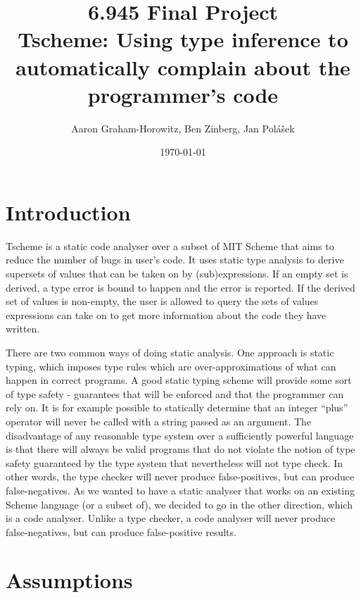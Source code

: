\documentclass[a4paper]{article}
\begin{document}
\title{6.945 Final Project\\
Tscheme: Using type inference to automatically complain about the programmer's code}
\date{\today}
\author{Aaron Graham-Horowitz, Ben Zinberg, Jan Polášek}
\maketitle

\newpage

\section{Introduction}

Tscheme is a static code analyser over a subset of MIT Scheme
that aims to reduce the number of bugs in user's code.
It uses static type analysis to derive supersets of values that can be taken on by
(sub)expressions.
If an empty set is derived, a type error is bound to happen and the error is reported.
If the derived set of values is non-empty, the user is allowed to query the sets of
values expressions can take on to get more information about the code they have written.

There are two common ways of doing static analysis.
One approach is static typing, which imposes type rules which are
over-approximations of what can happen in correct programs.
A good static typing scheme will provide some sort of type safety -
guarantees that will be enforced and that the programmer can rely on.
It is for example possible to statically determine that an integer ``plus''
operator will never be called with a string passed as an argument.
The disadvantage of any reasonable type system over a sufficiently powerful language
is that there will always be valid programs that do not violate the notion of
type safety guaranteed by the type system that nevertheless will not type check.
In other words, the type checker will never produce false-positives,
but can produce false-negatives.
As we wanted to have a static analyser that works on an existing Scheme
language (or a subset of), we decided to go in the other direction,
which is a code analyser.
Unlike a type checker, a code analyser will never produce false-negatives,
but can produce false-positive results.

\section{Assumptions}
\end{document}
